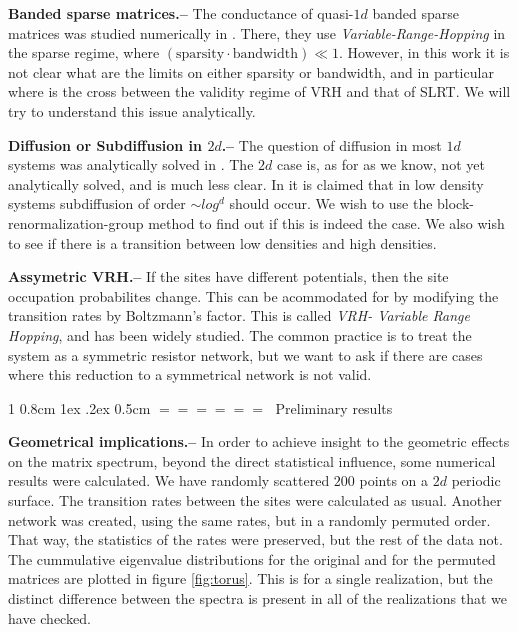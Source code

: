 \documentclass[onecolumn,fleqn,notitlepage,secnumarabic]{revtex4}
\makeatletter
\def\section{%
  \@startsection
    {section}%
    {1}%
    {\z@}%
    {0.8cm \@plus1ex \@minus .2ex}%
    {0.5cm}%
    {\Large\bf $=\!=\!=\!=\!=\!=\;$}%
}%
\makeatother
\begin{document}
{ \bf Banded sparse matrices.-- } The conductance of quasi-$1d$ banded sparse matrices was studied numerically in \cite{Stotland:2010:PRB}. There, they use \emph{Variable-Range-Hopping} in the sparse regime, where 
$(\text{sparsity}\cdot \text{bandwidth}) \ll 1$. However, in this work it is not clear what are the limits on either sparsity or bandwidth, and in particular where is the cross between the validity regime of VRH and that of SLRT. We will try to understand this issue analytically.

{ \bf Diffusion or Subdiffusion in $2d$.-- } The question of diffusion in most $1d$ systems was analytically solved in \cite{Alexander:1981:RMP}. The $2d$ case is, as for as we know, not yet analytically solved, and is much less clear. In \cite{Amir:2010:PRL} it is claimed that in low density systems subdiffusion of order $\sim log^d$ should occur. We wish to use the block-renormalization-group method to find out if this is indeed the case. We also wish to see if there is a transition between low densities and high densities.

{\bf Assymetric VRH.--} If the sites have different potentials, then the site occupation probabilites change. This can be acommodated for by modifying the transition rates by Boltzmann's factor. This is called \emph{VRH- Variable Range Hopping}\cite{Ambegaokar:1971}, and has been widely studied. The common practice is to treat the system as a symmetric resistor network, but we want to ask if there are cases where this reduction to a symmetrical network is not valid.


\section{Preliminary results} \label{sec:prelim}

{ \bf Geometrical implications.-- } In order to achieve insight to the geometric effects on the matrix spectrum, beyond the direct statistical influence, some numerical results were calculated. We have randomly scattered $200$ points on a $2d$ periodic surface. The transition rates between the sites were calculated as usual. Another network was created, using the same rates, but in a randomly permuted order. That way, the statistics of the rates were preserved, but the rest of the data not. The cummulative eigenvalue distributions for the original and for the permuted matrices are plotted in figure \ref{fig:torus}. This is for a single realization, but the distinct difference between the spectra is present in all of the realizations that we have checked.
\end{document}
